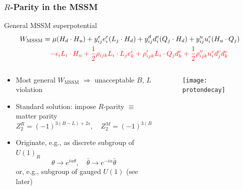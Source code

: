 \documentclass[10pt,aspectratio=169]{beamer}
\begin{document}
\begin{frame}
  \frametitle{$R$-Parity in the MSSM}
  \vspace*{-5pt}
  \begin{block}{General MSSM superpotential}
    \begin{align*}
      W_{\text{MSSM}} &= \mu ( H_d \cdot H_u )
      + y_{ij}^e e^c_i ( L_j \cdot H_d )
      + y_{ij}^d d^c_i ( Q_j \cdot H_d )
      + y_{ij}^u u_i^c ( H_u \cdot Q_j ) \\
      & \quad {} {\color{red} - \epsilon_i L_i \cdot H_u
      + \frac{1}{2} \rho_{ijk} L_i \cdot L_j e_k^c
      + \rho^\prime_{ijk} L_i \cdot Q_j d_k^c
      + \frac{1}{2} \rho^{\prime\prime}_{ijk} u_i^c d_j^c d_k^c }
    \end{align*}
  \end{block}
  \vspace*{-10pt}
  \begin{columns}[t]
    \begin{column}{0.5\textwidth}
      \begin{itemize}
      \item Most general $W_{\text{MSSM}}$ $\Rightarrow$
        unacceptable $B$, $L$ violation
      \item Standard solution: impose {\color{blue} $R$-parity
        $\equiv$ matter parity}
        \begin{equation*}
          Z_2^R = (-1)^{3 (B - L) + 2 s}, \quad
          Z_2^M = (-1)^{3(B - L)}
        \end{equation*}
      \item Originate, e.g., as discrete subgroup of $U(1)_R$
        \begin{equation*}
          \theta \to e^{i \alpha \theta} , \quad \bar{\theta} \to
          e^{-i \alpha} \bar{\theta}
        \end{equation*}
        or, e.g., subgroup of gauged $U(1)$ (see later)
      \end{itemize}
    \end{column}
    \begin{column}{0.5\textwidth}
      \begin{figure}
        \texttt{[image: protondecay]}
      \end{figure}
    \end{column}
  \end{columns}
\end{frame}
\end{document}
